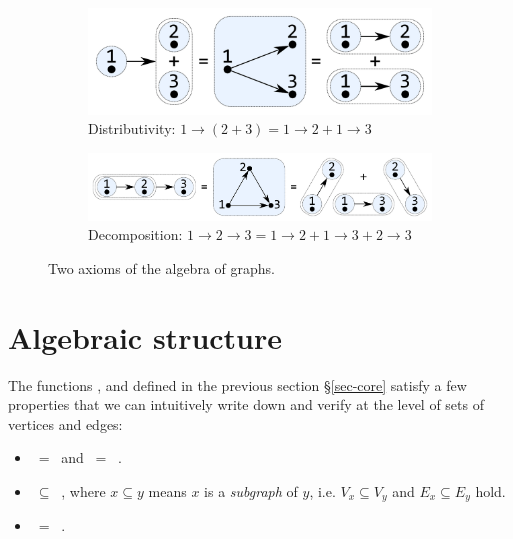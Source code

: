 \begin{figure}
\begin{subfigure}[b]{0.4\linewidth}
\centerline{\includegraphics[scale=0.27]{fig/ax-distributivity.pdf}}
\caption{Distributivity: $1 \rightarrow (2 + 3) = 1 \rightarrow 2 + 1 \rightarrow 3$ }
\end{subfigure}
\hspace{12mm}
\begin{subfigure}[b]{0.5\linewidth}
\centerline{\includegraphics[scale=0.27]{fig/ax-decomposition.pdf}}
\caption{Decomposition: $1 \rightarrow 2 \rightarrow 3 = 1 \rightarrow 2 +
1 \rightarrow 3 + 2 \rightarrow 3$}
\end{subfigure}
\caption{Two axioms of the algebra of graphs.\label{fig-axioms}}
\end{figure}

\section{Algebraic structure}\label{sec-algebra}

The functions ,  and  defined in the previous
section \S\ref{sec-core} satisfy a few properties that we can intuitively write down
and verify at the level of sets of vertices and edges:
\begin{itemize}
    \item {} $\ =\ $  and
     $\ =\ $ .
    \item {} $\ \subseteq\ $ , where $x \subseteq y$ means
    $x$ is a \emph{subgraph} of $y$, i.e. $V_x\subseteq V_y$ and $E_x\subseteq E_y$ hold.
    \item {} $\ =\ $ .
\end{itemize}

